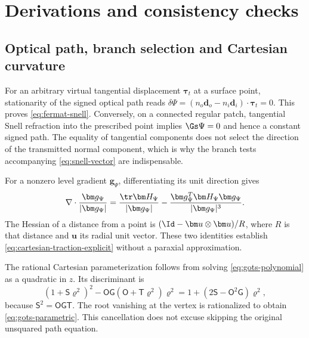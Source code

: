 \section{Derivations and consistency checks}\label{sec:derivations}

\subsection{Optical path, branch selection and Cartesian curvature}
For an arbitrary virtual tangential displacement $\bm\tau_t$ at a surface
point, stationarity of the signed optical path reads
$\delta\Psi=(n_o\bm d_o-n_i\bm d_i)\cdot\bm\tau_t=0$. This proves
\cref{eq:fermat-snell}. Conversely, on a connected regular patch, tangential
Snell refraction into the prescribed point implies $\Gs\Psi=0$ and hence a
constant signed path. The equality of tangential components does not select
the direction of the transmitted normal component, which is why the branch
tests accompanying \cref{eq:snell-vector} are indispensable.

For a nonzero level gradient $\bm g_\Psi$, differentiating its unit direction
gives
\begin{equation}
 \nabla\cdot\frac{\bm g_\Psi}{|\bm g_\Psi|}
 =\frac{\tr\bm H_\Psi}{|\bm g_\Psi|}
  -\frac{\bm g_\Psi^T\bm H_\Psi\bm g_\Psi}{|\bm g_\Psi|^3}.
 \label{eq:implicit-curvature-proof}
\end{equation}
The Hessian of a distance from a point is
$(\Id-\bm u\otimes\bm u)/R$, where $R$ is that distance and $\bm u$ its radial
unit vector. These two identities establish
\cref{eq:cartesian-traction-explicit} without a paraxial approximation.

The rational Cartesian parameterization follows from solving
\cref{eq:gots-polynomial} as a quadratic in $z$. Its discriminant is
\begin{equation}
 (1+\mathsf S\varrho^2)^2
 -\mathsf O\mathsf G(\mathsf O+\mathsf T\varrho^2)\varrho^2
 =1+(2\mathsf S-\mathsf O^2\mathsf G)\varrho^2,
 \label{eq:gots-discriminant}
\end{equation}
because $\mathsf S^2=\mathsf O\mathsf G\mathsf T$. The root vanishing at the
vertex is rationalized to obtain \cref{eq:gots-parametric}. This cancellation
does not excuse skipping the original unsquared path equation.

